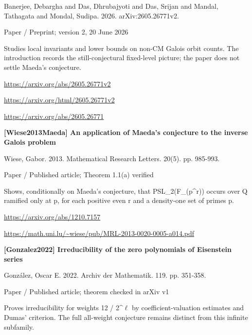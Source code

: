 \documentclass[11pt,a4paper,oneside,openany]{book}
\begin{document}
\color{black} Banerjee, Debargha and Das, Dhrubajyoti and Das, Srijan and Mandal, Tathagata and Mondal, Sudipa. 2026. arXiv:2605.26771v2.\par
{\small\sffamily\color{atlasgold}Paper / Preprint; version 2, 20 June 2026}\par
\color{black} Studies local invariants and lower bounds on non-CM Galois orbit counts. The introduction records the still-conjectural fixed-level picture; the paper does not settle Maeda's conjecture.\par
{\footnotesize\url{https://arxiv.org/abs/2605.26771v2}}\par
{\footnotesize\url{https://arxiv.org/html/2605.26771v2}}\par
{\footnotesize\url{https://arxiv.org/abs/2605.26771}}\par
\vspace{9pt}
\hypertarget{ref:Wiese2013Maeda}{}
{\sffamily\bfseries\color{atlasgreen}[Wiese2013Maeda] An application of Maeda's conjecture to the inverse Galois problem}\par
\color{black} Wiese, Gabor. 2013. Mathematical Research Letters. 20(5). pp. 985-993.\par
{\small\sffamily\color{atlasgold}Paper / Published article; Theorem 1.1(a) verified}\par
\color{black} Shows, conditionally on Maeda's conjecture, that PSL\_\allowbreak{}2(F\_\allowbreak{}(p\textasciicircum{}r)) occurs over Q ramified only at p, for each positive even r and a density-one set of primes p.\par
{\footnotesize\url{https://arxiv.org/abs/1210.7157}}\par
{\footnotesize\url{https://math.uni.lu/~wiese/pub/MRL-2013-0020-0005-a014.pdf}}\par
\vspace{9pt}
\hypertarget{ref:Gonzalez2022}{}
{\sffamily\bfseries\color{atlasgreen}[Gonzalez2022] Irreducibility of the zero polynomials of Eisenstein series}\par
\color{black} González, Oscar E. 2022. Archiv der Mathematik. 119. pp. 351-358.\par
{\small\sffamily\color{atlasgold}Paper / Published article; theorem checked in arXiv v1}\par
\color{black} Proves irreducibility for weights 12 / 2\textasciicircum{}\ensuremath{\ell} by coefficient-valuation estimates and Dumas' criterion. The full all-weight conjecture remains distinct from this infinite subfamily.\par
\end{document}
